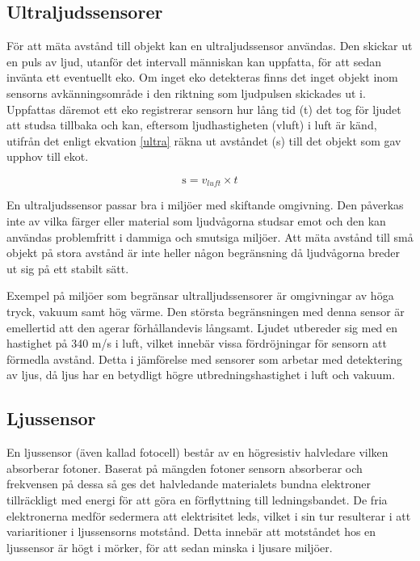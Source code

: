 \documentclass[11pt]{article}
\begin{document}
\begin{flushleft}
\subsection{Ultraljudssensorer}
För att mäta avstånd till objekt kan en ultraljudssensor användas. Den skickar ut en puls av ljud, utanför det intervall människan kan uppfatta, för att sedan invänta ett eventuellt eko. Om inget eko detekteras finns det inget objekt inom sensorns avkänningsområde i den riktning som ljudpulsen skickades ut i. Uppfattas däremot ett eko registrerar sensorn hur lång tid (t) det tog för ljudet att studsa tillbaka och kan, eftersom ljudhastigheten (vluft) i luft är känd, utifrån det enligt ekvation \ref{ultra} räkna ut avståndet (s) till det objekt som gav upphov till ekot. \cite{Ultraljud}

\begin{equation}\label{ultra}
	\textrm{s} = v_{luft} \times t 				
\end{equation}

En ultraljudssensor passar bra i miljöer med skiftande omgivning. Den påverkas inte av vilka färger eller material som ljudvågorna studsar emot och den kan användas problemfritt i dammiga och smutsiga miljöer. Att mäta avstånd till små objekt på stora avstånd är inte heller någon begränsning då ljudvågorna breder ut sig på ett stabilt sätt. \cite{Ultraljud}

Exempel på miljöer som begränsar ultralljudssensorer är omgivningar av höga tryck, vakuum samt hög värme. Den största begränsningen med denna sensor är emellertid att den agerar förhållandevis långsamt. Ljudet utbereder sig med en hastighet på 340 m/s i luft, vilket innebär vissa fördröjningar för sensorn att förmedla avstånd. Detta i jämförelse med sensorer som arbetar med detektering av ljus, då ljus har en betydligt högre utbredningshastighet i luft och vakuum. \cite{Ultraljud}

\subsection{Ljussensor}
En ljussensor (även kallad fotocell) består av en högresistiv halvledare vilken absorberar fotoner. Baserat på mängden fotoner sensorn absorberar och frekvensen på dessa så ges det halvledande materialets bundna elektroner tillräckligt med energi för att göra en förflyttning till ledningsbandet. De fria elektronerna medför sedermera att elektrisitet leds,  vilket i sin tur resulterar i att variaritioner i ljussensorns motstånd. Detta innebär att motståndet hos en ljussensor är högt i mörker, för att sedan minska i ljusare miljöer. \cite{612896}


\end{flushleft}
\end{document}
